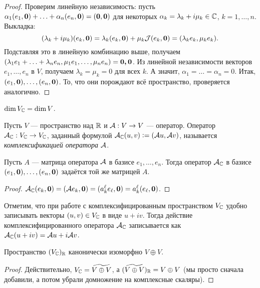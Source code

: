 \begin{proof}
    Проверим линейную независимость: пусть $\alpha_1(e_1, \boldsymbol{0}) + \ldots + \alpha_n(e_n, \boldsymbol{0}) = (\boldsymbol{0}, \boldsymbol{0})$ для некоторых $\alpha_k = \lambda_k + i\mu_k \in \mathbb{C}$, $k = 1, \ldots, n$. Выкладка:
    \[
        (\lambda_k + i\mu_k)(e_k, \boldsymbol{0}) = \lambda_k(e_k, \boldsymbol{0}) + \mu_k\mathcal{J}(e_k, \boldsymbol{0}) = (\lambda_ke_k, \mu_ke_k).
    \]
    Подставляя это в линейную комбинацию выше, получаем $(\lambda_1e_1 + \ldots + \lambda_ne_n, \mu_1e_1, \ldots, \mu_ne_n) = \boldsymbol{0, 0}$. Из линейной независимости векторов $e_1, \ldots, e_n$ в $V$, получаем $\lambda_k = \mu_k = 0$ для всех $k$. А значит, $\alpha_1 = \ldots = \alpha_n = 0$. Итак, $(e_1, \boldsymbol{0}), \ldots, (e_n, \boldsymbol{0})$. То, что они порождают всё пространство, проверяется аналогично.
\end{proof}

\begin{corollary}
    $\dim V_{\mathbb{C}} = \dim V$.
\end{corollary}

\begin{definition}
    Пусть $V$ --- пространство над $\mathbb{R}$ и $\mathcal{A}: V \to V$ --- оператор. Оператор $\mathcal{A}_{\mathbb{C}}: V_{\mathbb{C}} \to V_{\mathbb{C}}$, заданный формулой $\mathcal{A}_{\mathbb{C}}(u, v) \vcentcolon = (\mathcal{A} u, \mathcal{A} v)$, называется \textit{комплексификацией оператора} $\mathcal{A}$.
\end{definition}

\begin{proposal}
    Пусть $A$ --- матрица оператора $\mathcal{A}$ в базисе $e_1, \ldots, e_n$. Тогда оператор $\mathcal{A}_{\mathbb{C}}$ в базисе $(e_1, \boldsymbol{0}), \ldots, (e_n, \boldsymbol{0})$ задаётся той же матрицей $A$.
\end{proposal}

\begin{proof}
    $\mathcal{A}_{\mathbb{C}}(e_k, \boldsymbol{0}) = (\mathcal{A} e_k, \boldsymbol{0}) = (a^\ell_ke_\ell, \boldsymbol{0}) = a^\ell_k(e_\ell, \boldsymbol{0})$.
\end{proof}

Отметим, что при работе с комплексифицированным пространством $V_{\mathbb{C}}$ удобно записывать векторы $(u, v) \in V_{\mathbb{C}}$ в виде $u + iv$. Тогда действие комплексифицированного оператора $\mathcal{A}_{\mathbb{C}}$ записывается как $\mathcal{A}_{\mathbb{C}}(u + iv) = \mathcal{A} u + i\mathcal{A} v$.

\begin{proposal}
    Пространство $(V_{\mathbb{C}})_{\mathbb{R}}$ канонически изоморфно $V \oplus V$.
\end{proposal}

\begin{proof}
    Действительно, $V_{\mathbb{C}} = \widetilde{V \oplus V}$, а $(\widetilde{V \oplus V})_{\mathbb{R}} = V \oplus V$ (мы просто сначала добавили, а потом убрали домножение на комплексные скаляры).
\end{proof}

